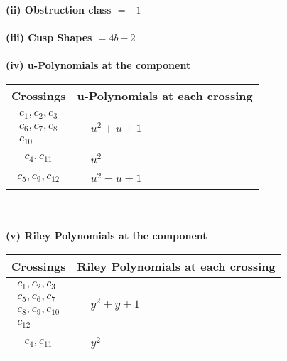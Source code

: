 \documentclass[1p]{elsarticle_modified}
\theoremstyle{definition}
\begin{document}
\flushleft \textbf{(ii) Obstruction class $= -1$}\\~\\
\flushleft \textbf{(iii) Cusp Shapes $= 4 b-2$}\\~\\
\newpage\renewcommand{\arraystretch}{1}
\flushleft \textbf{(iv) u-Polynomials at the component}\newline \\
\begin{tabular}{m{50pt}|m{274pt}}
Crossings & \hspace{64pt}u-Polynomials at each crossing \\
\hline $$\begin{aligned}c_{1},c_{2},c_{3}\\c_{6},c_{7},c_{8}\\c_{10}\end{aligned}$$&$\begin{aligned}
&u^2+u+1
\end{aligned}$\\
\hline $$\begin{aligned}c_{4},c_{11}\end{aligned}$$&$\begin{aligned}
&u^2
\end{aligned}$\\
\hline $$\begin{aligned}c_{5},c_{9},c_{12}\end{aligned}$$&$\begin{aligned}
&u^2- u+1
\end{aligned}$\\
\hline
\end{tabular}\\~\\
\newpage\renewcommand{\arraystretch}{1}
\flushleft \textbf{(v) Riley Polynomials at the component}\newline \\
\begin{tabular}{m{50pt}|m{274pt}}
Crossings & \hspace{64pt}Riley Polynomials at each crossing \\
\hline $$\begin{aligned}c_{1},c_{2},c_{3}\\c_{5},c_{6},c_{7}\\c_{8},c_{9},c_{10}\\c_{12}\end{aligned}$$&$\begin{aligned}
&y^2+y+1
\end{aligned}$\\
\hline $$\begin{aligned}c_{4},c_{11}\end{aligned}$$&$\begin{aligned}
&y^2
\end{aligned}$\\
\hline
\end{tabular}\\~\\
\end{document}
